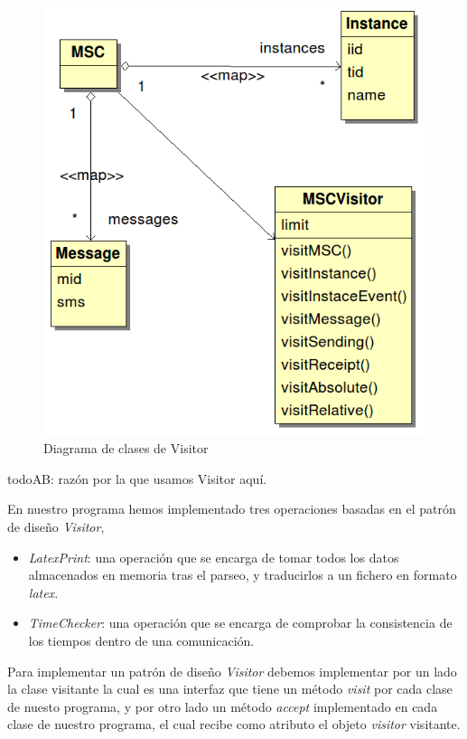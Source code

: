 \begin{figure}
  \centering 
  \includegraphics[scale=0.7]{./images/diag_visitor.png}
  \caption{Diagrama de clases de Visitor}
  \label{fig:diagvisitor}
\end{figure}

todo{AB: razón por la que usamos Visitor aquí.}

En nuestro programa hemos implementado tres operaciones basadas en el
patrón de diseño \textit{Visitor},
\begin{itemize}
\item \textit{LatexPrint}: una operación que se encarga de tomar todos
  los datos almacenados en memoria tras el parseo, y traducirlos a un
  fichero en formato \textit{latex}.
\item \textit{TimeChecker}: una operación que se encarga de comprobar
  la consistencia de los tiempos dentro de una comunicación. 
\end{itemize}

Para implementar un patrón de diseño \textit{Visitor} debemos
implementar por un lado la clase visitante la cual es una interfaz que
tiene un método \textit{visit} por cada clase de nuesto programa, y
por otro lado un método \textit{accept} implementado en cada clase de
nuestro programa, el cual recibe como atributo el objeto
\textit{visitor} visitante.

